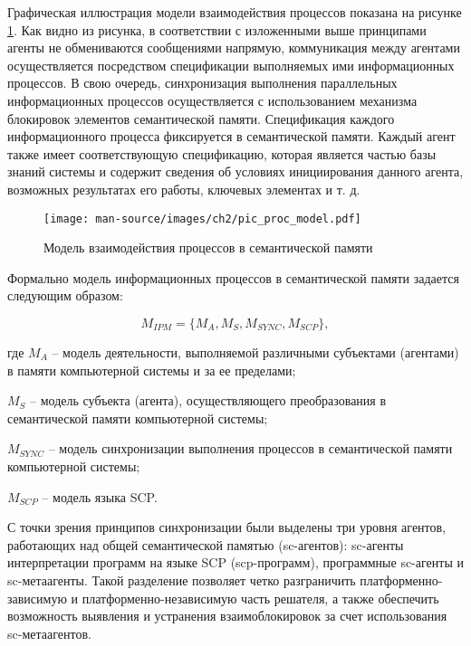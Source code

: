 \documentclass{thesisby}
\begin{document}
Графическая иллюстрация модели взаимодействия процессов показана на рисунке \ref{fig:pic_proc_model}. Как видно из рисунка, в соответствии с изложенными выше принципами агенты не обмениваются сообщениями напрямую, коммуникация между агентами осуществляется посредством спецификации выполняемых ими информационных процессов. В свою очередь, синхронизация выполнения параллельных информационных процессов осуществляется с использованием механизма блокировок элементов семантической памяти. Спецификация каждого информационного процесса фиксируется в семантической памяти. Каждый агент также имеет соответствующую спецификацию, которая является частью базы знаний системы и содержит сведения об условиях инициирования данного агента, возможных результатах его работы, ключевых элементах и т. д.

\begin{figure}[H]
  \centering
  \texttt{[image: man-source/images/ch2/pic\_proc\_model.pdf]}
  \caption{Модель взаимодействия процессов в семантической памяти}
  \label{fig:pic_proc_model}
\end{figure}

Формально модель информационных процессов в семантической памяти задается следующим образом:

\begin{equation} 
\label{<eq2_1>} 
M_{IPM} = \{M_A, M_S, M_{SYNC}, M_{SCP}\},
\end{equation} 

\noindent \hangindent=21mm 
где $M_A$ – модель деятельности, выполняемой различными субъектами (агентами) в памяти компьютерной системы и за ее пределами;

\parindent=9mm \hangindent=23mm 
$M_S$ – модель субъекта (агента), осуществляющего преобразования в семантической памяти компьютерной системы;

\parindent=9mm \hangindent=31mm 
$M_{SYNC}$ – модель синхронизации выполнения процессов в семантической памяти компьютерной системы;

\parindent=9mm
$M_{SCP}$ – модель языка SCP.

\medskip
\parindent=1cm

С точки зрения принципов синхронизации были выделены три уровня агентов, работающих над общей семантической памятью (sc-агентов): \mbox{sc-агенты} интерпретации программ на языке SCP (scp-программ), программные \mbox{sc-агенты} и \mbox{sc-метаагенты}. Такой разделение позволяет четко разграничить платформенно-зависимую и платформенно-независимую часть решателя, а также обеспечить возможность выявления и устранения взаимоблокировок за счет использования sc-метаагентов.
\end{document}

